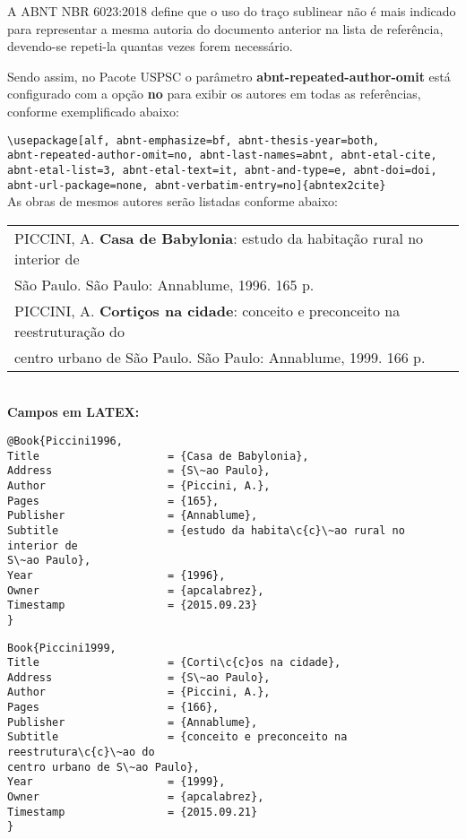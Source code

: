 A ABNT NBR 6023:2018 define que o uso do tra\c{c}o sublinear n\~ao \'e mais indicado para representar a mesma autoria do documento anterior na lista de refer\^encia, devendo-se repeti-la quantas vezes forem necess\'ario.

Sendo assim, no Pacote USPSC o par\^ametro \textbf{abnt-repeated-author-omit} est\'a configurado com a op\c{c}\~ao \textbf{no} para exibir os autores em todas as refer\^encias, conforme exemplificado abaixo: 

\verb+\usepackage[alf, abnt-emphasize=bf, abnt-thesis-year=both, + \\ \verb+abnt-repeated-author-omit=no, abnt-last-names=abnt, abnt-etal-cite,+ \\
\verb+abnt-etal-list=3, abnt-etal-text=it, abnt-and-type=e, abnt-doi=doi,+ \\ \verb+abnt-url-package=none, abnt-verbatim-entry=no]{abntex2cite}+ \\

As obras de mesmos autores ser\~ao listadas conforme abaixo: \\

\begin{tabular}{|l|c|} \hline
	PICCINI, A. \textbf{Casa de Babylonia}: estudo da habita\c{c}\~ao rural no interior de \\S\~ao Paulo. S\~ao Paulo: Annablume, 1996. 165 p. \\
	
	PICCINI, A. \textbf{Corti\c{c}os na cidade}: conceito e preconceito na reestrutura\c{c}\~ao do \\centro urbano de  S\~ao Paulo. S\~ao Paulo: Annablume, 1999. 166 p.   \\\hline
\end{tabular}\\

\textbf{Campos em LATEX:}

\begin{verbatim}
@Book{Piccini1996,
Title                    = {Casa de Babylonia},
Address                  = {S\~ao Paulo},
Author                   = {Piccini, A.},
Pages                    = {165},
Publisher                = {Annablume},
Subtitle                 = {estudo da habita\c{c}\~ao rural no interior de 
S\~ao Paulo},
Year                     = {1996},
Owner                    = {apcalabrez},
Timestamp                = {2015.09.23}
}
\end{verbatim}

\begin{verbatim}
Book{Piccini1999,
Title                    = {Corti\c{c}os na cidade},
Address                  = {S\~ao Paulo},
Author                   = {Piccini, A.},
Pages                    = {166},
Publisher                = {Annablume},
Subtitle                 = {conceito e preconceito na reestrutura\c{c}\~ao do 
centro urbano de S\~ao Paulo},
Year                     = {1999},
Owner                    = {apcalabrez},
Timestamp                = {2015.09.21}
}
\end{verbatim}

